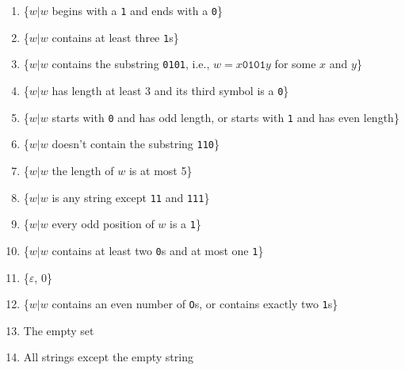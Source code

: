 \documentclass{article}
\begin{document}
\begin{enumerate}
\item \{$w|w$ begins with a \texttt{1} and ends with a \texttt{0}\}
\item \{$w|w$ contains at least three \texttt{1}s\}
\item \{$w|w$ contains the substring \texttt{0101}, i.e., $w = x\texttt{0101}y$
for some $x$ and $y$\}
\item \{$w|w$ has length at least 3 and its third symbol is a \texttt{0}\}
\item \{$w|w$ starts with \texttt{0} and has odd length, or starts with
\texttt{1} and has even length\}
\item \{$w|w$ doesn't contain the substring \texttt{110}\}
\item \{$w|w$ the length of $w$ is at most 5\}
\item \{$w|w$ is any string except \texttt{11} and \texttt{111}\}
\item \{$w|w$ every odd position of $w$ is a \texttt{1}\}
\item \{$w|w$ contains at least two \texttt{0}s and at most one \texttt{1}\}
\item \{$\varepsilon$, $0$\}
\item \{$w|w$ contains an even number of \texttt{O}s, or contains exactly two
\texttt{1}s\}
\item The empty set
\item All strings except the empty string
\end{enumerate}
\end{document}
